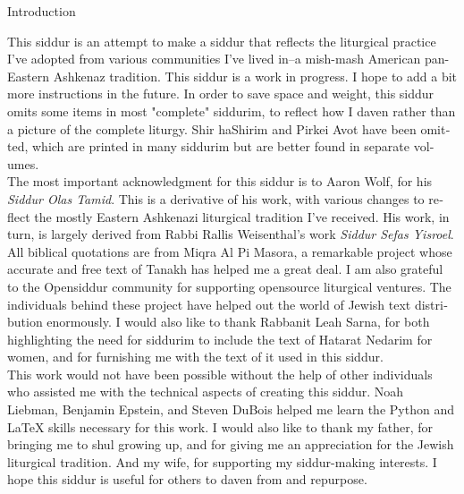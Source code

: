 \documentclass[twoside, openany, parskip=half, 11pt]{book}
\begin{document}
\begin{minipage}{\textwidth}

\begin{english}
\begin{center} %
\begin{LARGE}
Introduction
\end{LARGE}
\end{center}

This siddur is an attempt to make a siddur that reflects the liturgical practice I've adopted from various communities I've lived in--a mish-mash American pan-Eastern Ashkenaz tradition. This siddur is a work in progress. I hope to add a bit more instructions in the future. In order to save space and weight, this siddur omits some items in most "complete" siddurim, to reflect how I daven rather than a picture of the complete liturgy. Shir haShirim and Pirkei Avot have been omitted, which are printed in many siddurim but are better found in separate volumes.\\

The most important acknowledgment for this siddur is to Aaron Wolf, for his \textit{Siddur Olas Tamid}. This is a derivative of his work, with various changes to reflect the mostly Eastern Ashkenazi liturgical tradition I've received. His work, in turn, is largely derived from Rabbi Rallis Weisenthal's work \textit{Siddur Sefas Yisroel}. All biblical quotations are from Miqra Al Pi Masora, a remarkable project whose accurate and free text of Tanakh has helped me a great deal. I am also grateful to the Opensiddur community for supporting opensource liturgical ventures. The individuals behind these project have helped out the world of Jewish text distribution enormously. I would also like to thank Rabbanit Leah Sarna, for both highlighting the need for siddurim to include the text of Hatarat Nedarim for women, and for furnishing me with the text of it used in this siddur.\\

This work would not have been possible without the help of other individuals who assisted me with the technical aspects of creating this siddur. Noah Liebman, Benjamin Epstein, and Steven DuBois helped me learn the Python and \LaTeX{} skills necessary for this work. I would also like to thank my father, for bringing me to shul growing up, and for giving me an appreciation for the Jewish liturgical tradition. And my wife, for supporting my siddur-making interests. I hope this siddur is useful for others to daven from and repurpose.

\end{english}

\end{minipage}
\end{document}
